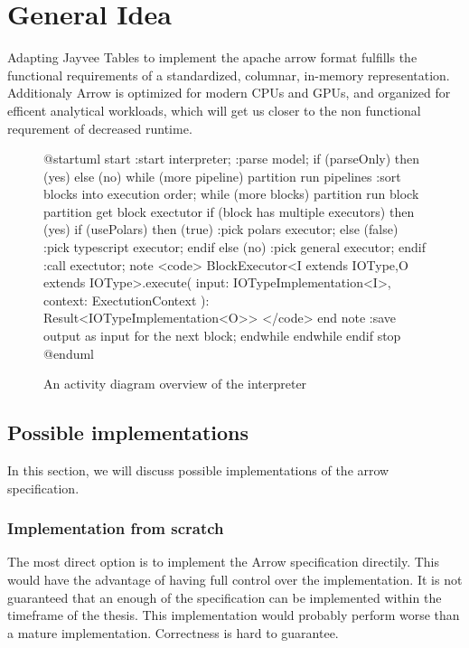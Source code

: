 \section{General Idea}
\label{section:General Idea}

Adapting Jayvee Tables to implement the apache arrow format fulfills the functional requirements of a standardized, columnar, in-memory representation.
Additionaly Arrow is optimized for modern CPUs and GPUs, and organized for efficent analytical workloads, which will get us closer to the non functional requrement of decreased runtime. %

\begin{figure}
	\begin{plantuml}
		@startuml
		start
		:start interpreter;
		:parse model;
		if (parseOnly) then (yes)
		else (no)
		while (more pipeline)
		partition run pipelines {
				:sort blocks into execution order;
				while (more blocks)
				partition run block {
						partition get block exectutor {
								if (block has multiple executors) then (yes)
								if (usePolars) then (true)
								:pick polars executor;
								else (false)
								:pick typescript executor;
								endif
								else (no)
								:pick general executor;
								endif
							}
						:call exectutor;
						note
						<code>
						BlockExecutor<I extends IOType,O extends IOType>.execute(
						input: IOTypeImplementation<I>,
						context: ExectutionContext
						): Result<IOTypeImplementation<O>>
						</code>
						end note
						:save output as input for the next block;
					}
				endwhile
			}
		endwhile
		endif
		stop
		@enduml
	\end{plantuml}
	\caption{An activity diagram overview of the interpreter}
	\label{fig:interpreter_activity}
\end{figure}


\subsection{Possible implementations}
\label{subsection:arrow implementations}

In this section, we will discuss possible implementations of the arrow specification.

\subsubsection{Implementation from scratch}
\label{subsubsection:direct_implementation}
The most direct option is to implement the Arrow specification directily.
This would have the advantage of having full control over the implementation.
It is not guaranteed that an enough of the specification can be implemented within the timeframe of the thesis.
This implementation would probably perform worse than a mature implementation.
Correctness is hard to guarantee.


